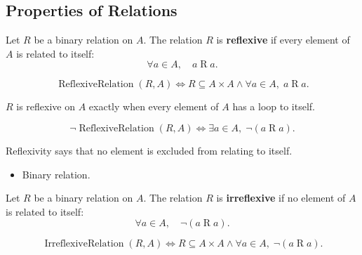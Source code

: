 \subsection{Properties of Relations}
\label{subsec:properties-of-relations}

\begin{definition}
\label{def:rel-reflexive}
Let $R$ be a binary relation on $A$.
The relation $R$ is \textbf{reflexive} if every element of $A$ is related to
itself:
\[
\forall a \in A,\quad a \mathrel{R} a.
\]
\end{definition}

\begin{remark*}
\[
\operatorname{ReflexiveRelation}(R,A)
\Longleftrightarrow
R\subseteq A\times A
\land
\forall a\in A,\; a\mathrel{R}a.
\]
\end{remark*}

\begin{remark*}
$R$ is reflexive on $A$ exactly when every element of $A$ has a loop to itself.
\end{remark*}

\begin{remark*}
\[
\neg\operatorname{ReflexiveRelation}(R,A)
\Longleftrightarrow
\exists a\in A,\; \lnot(a\mathrel{R}a).
\]
\end{remark*}

\begin{remark*}[Interpretation]
Reflexivity says that no element is excluded from relating to itself.
\end{remark*}

\begin{remark*}[Dependencies]
\begin{itemize}
  \item Binary relation.
\end{itemize}
\end{remark*}

\begin{definition}
\label{def:rel-irreflexive}
Let $R$ be a binary relation on $A$.
The relation $R$ is \textbf{irreflexive} if no element of $A$ is related to
itself:
\[
\forall a \in A,\quad \lnot(a \mathrel{R} a).
\]
\end{definition}

\begin{remark*}
\[
\operatorname{IrreflexiveRelation}(R,A)
\Longleftrightarrow
R\subseteq A\times A
\land
\forall a\in A,\; \lnot(a\mathrel{R}a).
\]
\end{remark*}

